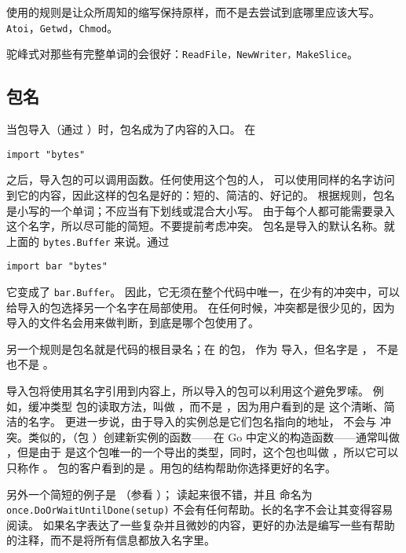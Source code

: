 使用的规则是让众所周知的缩写保持原样，而不是去尝试到底哪里应该大写。
\lstinline{Atoi}，\lstinline{Getwd}，\lstinline{Chmod}。

驼峰式对那些有完整单词的会很好：\lstinline{ReadFile，NewWriter，MakeSlice}。

\subsection{包名}
当包导入（通过 ）时，包名成为了内容的入口。
在 
\begin{lstlisting}
import "bytes"
\end{lstlisting}
之后，导入包的可以调用函数。任何使用这个包的人，
可以使用同样的名字访问到它的内容，因此这样的包名是好的：短的、简洁的、好记的。
根据规则，包名是小写的一个单词；不应当有下划线或混合大小写。
由于每个人都可能需要录入这个名字，所以尽可能的简短。不要提前考虑冲突。
包名是导入的默认名称。就上面的 \lstinline{bytes.Buffer} 来说。通过 
\begin{lstlisting}
import bar "bytes"
\end{lstlisting}
它变成了 \lstinline{bar.Buffer}。
因此，它无须在整个代码中唯一，在少有的冲突中，可以给导入的包选择另一个名字在局部使用。
在任何时候，冲突都是很少见的，因为导入的文件名会用来做判断，到底是哪个包使用了。

另一个规则是包名就是代码的根目录名；在  的包，
作为  导入，但名字是 ，
不是  也不是 。

导入包将使用其名字引用到内容上，所以导入的包可以利用这个避免罗嗦。
例如，缓冲类型  包的读取方法，叫做 ，而不是
，因为用户看到的是  这个清晰、简洁的名字。
更进一步说，由于导入的实例总是它们包名指向的地址， 不会与
 冲突。类似的，（包 ）创建新实例的函数——在 Go 中定义的构造函数——通常叫做
，但是由于  是这个包唯一的一个导出的类型，同时，这个包也叫做
，所以它可以只称作 。
包的客户看到的是 。用包的结构帮助你选择更好的名字。

另外一个简短的例子是 （参看 ）； 读起来很不错，并且
命名为 \lstinline{once.DoOrWaitUntilDone(setup)} 不会有任何帮助。长的名字不会让其变得容易阅读。
如果名字表达了一些复杂并且微妙的内容，更好的办法是编写一些有帮助的注释，而不是将所有信息都放入名字里。

